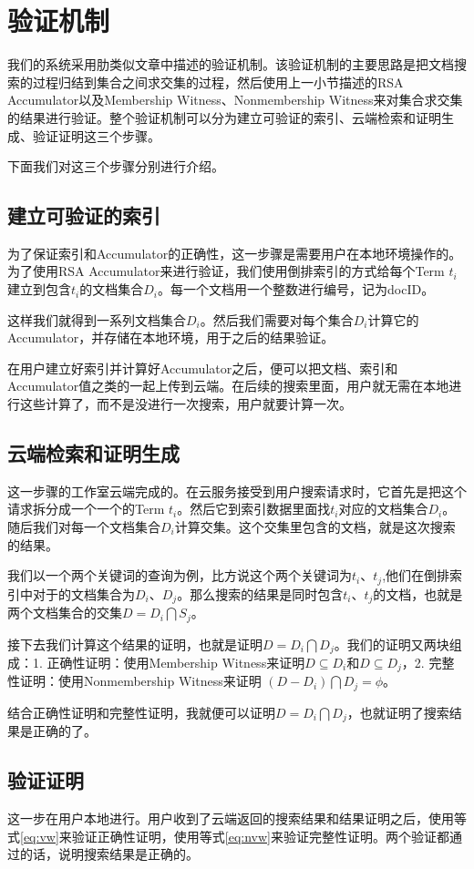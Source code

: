 \section{验证机制}
我们的系统采用肋类似文章\cite{verifiableindex}中描述的验证机制。该验证机制的主要思路是把文档搜索的过程归结到集合之间求交集的过程，然后使用上一小节描述的RSA Accumulator以及Membership Witness、Nonmembership Witness来对集合求交集的结果进行验证。整个验证机制可以分为建立可验证的索引、云端检索和证明生成、验证证明这三个步骤。

下面我们对这三个步骤分别进行介绍。
\subsection{建立可验证的索引}
为了保证索引和Accumulator的正确性，这一步骤是需要用户在本地环境操作的。为了使用RSA Accumulator来进行验证，我们使用倒排索引的方式给每个Term $t_i$建立到包含$t_i$的文档集合$D_i$。每一个文档用一个整数进行编号，记为docID。

这样我们就得到一系列文档集合$D_i$。然后我们需要对每个集合$D_i$计算它的Accumulator，并存储在本地环境，用于之后的结果验证。

在用户建立好索引并计算好Accumulator之后，便可以把文档、索引和Accumulator值之类的一起上传到云端。在后续的搜索里面，用户就无需在本地进行这些计算了，而不是没进行一次搜索，用户就要计算一次。

\subsection{云端检索和证明生成}
这一步骤的工作室云端完成的。在云服务接受到用户搜索请求时，它首先是把这个请求拆分成一个一个的Term $t_i$。然后它到索引数据里面找$t_i$对应的文档集合$D_i$。随后我们对每一个文档集合$D_i$计算交集。这个交集里包含的文档，就是这次搜索的结果。

我们以一个两个关键词的查询为例，比方说这个两个关键词为$t_i$、$t_j$,他们在倒排索引中对于的文档集合为$D_i$、$D_j$。那么搜索的结果是同时包含$t_i$、$t_j$的文档，也就是两个文档集合的交集$D = D_i \bigcap S_j$。

接下去我们计算这个结果的证明，也就是证明$D = D_i \bigcap D_j$。我们的证明又两块组成：1. 正确性证明：使用Membership Witness来证明$D \subseteq D_i$和$D \subseteq D_j$，2. 完整性证明：使用Nonmembership Witness来证明 $(D - D_i) \bigcap D_j = \phi$。

结合正确性证明和完整性证明，我就便可以证明$D = D_i \bigcap D_j$，也就证明了搜索结果是正确的了。

\subsection{验证证明}
这一步在用户本地进行。用户收到了云端返回的搜索结果和结果证明之后，使用等式\ref{eq:vw}来验证正确性证明，使用等式\ref{eq:nvw}来验证完整性证明。两个验证都通过的话，说明搜索结果是正确的。
